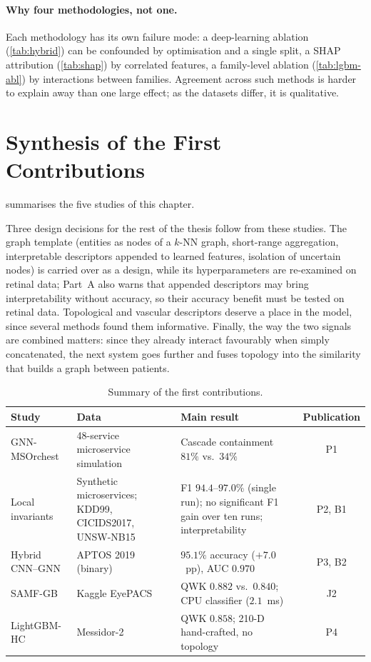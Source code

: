\paragraph{Why four methodologies, not one.}
Each methodology has its own failure mode: a deep-learning ablation (\cref{tab:hybrid})
can be confounded by optimisation and a single split, a SHAP attribution
(\cref{tab:shap}) by correlated features, a family-level ablation (\cref{tab:lgbm-abl}) by
interactions between families. Agreement across such methods is harder to explain away
than one large effect; as the datasets differ, it is qualitative.

\section{Synthesis of the First Contributions}
\label{sec:ch3-synthesis}

 summarises the five studies of this chapter.

Three design decisions for the rest of the thesis follow from these studies. The graph
template (entities as nodes of a $k$-NN graph, short-range aggregation, interpretable
descriptors appended to learned features, isolation of uncertain nodes) is carried over
as a design, while its hyperparameters are re-examined on retinal data; Part~A also
warns that appended descriptors may bring interpretability without accuracy, so their
accuracy benefit must be tested on retinal data. Topological and vascular descriptors
deserve a place in the model, since several methods found them informative. Finally, the
way the two signals are combined matters: since they already interact favourably when
simply concatenated, the next system goes further and fuses topology into the similarity
that builds a graph between patients.

\begin{table}[H]
\centering
\caption[Summary of the first contributions]{Summary of the first contributions.}
\label{tab:ch3summary}
\footnotesize
\begin{tabular}{@{}P{2.4cm} P{4.3cm} P{5.9cm} c@{}}
\toprule
Study & Data & Main result & Publication \\
\midrule
GNN-MSOrchest & 48-service microservice simulation & Cascade containment $81\%$ vs.\ $34\%$ & P1 \\
Local invariants & Synthetic microservices; KDD99, CICIDS2017, UNSW-NB15 & F1 $94.4$--$97.0\%$ (single run); no significant F1 gain over ten runs; interpretability & P2, B1 \\
Hybrid CNN--GNN & APTOS 2019 (binary) & $95.1\%$ accuracy ($+7.0$~pp), AUC $0.970$ & P3, B2 \\
SAMF-GB & Kaggle EyePACS & QWK $0.882$ vs.\ $0.840$; CPU classifier ($2.1$~ms) & J2 \\
LightGBM-HC & Messidor-2 & QWK $0.858$; 210-D hand-crafted, no topology & P4 \\
\bottomrule
\end{tabular}
\end{table}

